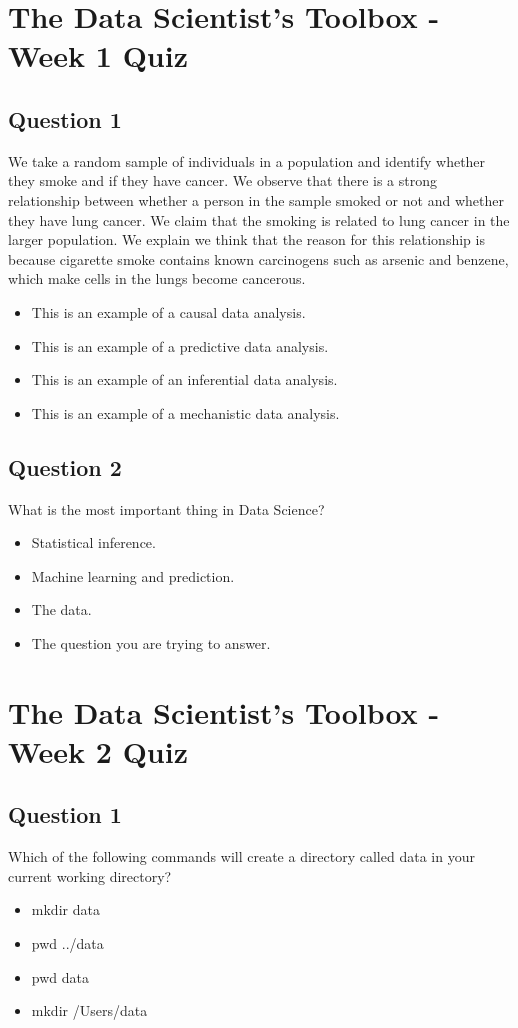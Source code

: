 \documentclass[12pt]{article}
\begin{document}
\section*{The Data Scientist’s Toolbox - Week 1 Quiz}
\subsection*{Question 1}
We take a random sample of individuals in a population and identify whether they smoke and if they have cancer. We observe that there is a strong relationship between whether a person in the sample smoked or not and whether they have lung cancer. We claim that the smoking is related to lung cancer in the larger population. We explain we think that the reason for this relationship is because cigarette smoke contains known carcinogens such as arsenic and benzene, which make cells in the lungs become cancerous.
\begin{itemize}
\item This is an example of a causal data analysis.
\item This is an example of a predictive data analysis.
\item This is an example of an inferential data analysis.
\item This is an example of a mechanistic data analysis.
\end{itemize}
\subsection*{Question 2}
What is the most important thing in Data Science?
\begin{itemize}
\item Statistical inference.
\item Machine learning and prediction.
\item The data.
\item The question you are trying to answer.
\end{itemize}

\newpage
\section*{The Data Scientist’s Toolbox - Week 2 Quiz}

\subsection*{Question 1}
Which of the following commands will create a directory called data in your current working directory?
\begin{itemize}
\item mkdir data
\item pwd ../data
\item pwd data
\item mkdir /Users/data
\end{itemize}
\end{document}
